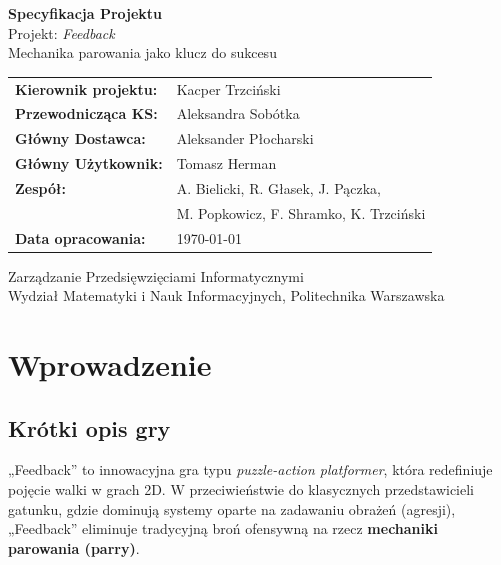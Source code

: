 \documentclass[11pt,a4paper]{article}
\begin{document}
\begin{titlepage}
\centering
\vspace*{2cm}
{\LARGE\bfseries\color{accent} Specyfikacja Projektu}\\[0.5cm]
{\large Projekt: \textit{Feedback}}\\[0.3cm]
{\normalsize Mechanika parowania jako klucz do sukcesu}\\[2cm]

\begin{tabular}{ll}
\textbf{Kierownik projektu:}   & Kacper Trzciński \\[0.3em]
\textbf{Przewodnicząca KS:}    & Aleksandra Sobótka \\[0.3em]
\textbf{Główny Dostawca:}      & Aleksander Płocharski \\[0.3em]
\textbf{Główny Użytkownik:}    & Tomasz Herman \\[0.3em]
\textbf{Zespół:}               & A. Bielicki, R. Głasek, J. Pączka, \\
                               & M. Popkowicz, F. Shramko, K. Trzciński \\[0.3em]
\textbf{Data opracowania:}     & \today \\[0.3em]
\end{tabular}

\vfill
{\small Zarządzanie Przedsięwzięciami Informatycznymi\\
Wydział Matematyki i Nauk Informacyjnych, Politechnika Warszawska}
\end{titlepage}

\newpage
\tableofcontents
\newpage

\section{Wprowadzenie}

\subsection{Krótki opis gry}
„Feedback” to innowacyjna gra typu \textit{puzzle-action platformer}, która redefiniuje pojęcie walki w grach 2D. W przeciwieństwie do klasycznych przedstawicieli gatunku, gdzie dominują systemy oparte na zadawaniu obrażeń (agresji), „Feedback” eliminuje tradycyjną broń ofensywną na rzecz \textbf{mechaniki parowania (parry)}.
\end{document}
